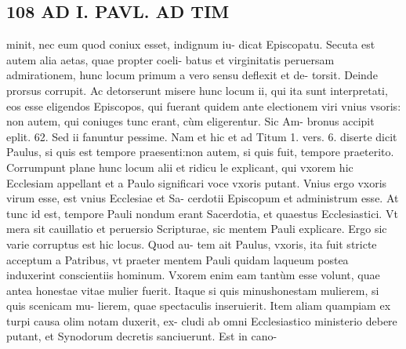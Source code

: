 \documentclass{article}
\begin{document}
\begin{pages}
\section*{108 AD I. PAVL. AD TIM }\pstart minit, nec eum quod coniux esset, indignum iu- dicat Episcopatu.  \pend\pstart Secuta est autem alia aetas, quae propter coeli- batus et virginitatis peruersam admirationem, hunc locum primum a vero sensu deflexit et de- torsit. Deinde prorsus corrupit. Ac detorserunt misere hunc locum ii, qui ita sunt interpretati, eos esse eligendos Episcopos, qui fuerant quidem ante electionem viri vnius vsoris: non autem, qui coniuges tunc erant, cùm eligerentur. Sic Am- bronus accipit eplit. 62. Sed ii fanuntur pessime. Nam et hic et ad Titum 1. vers. 6. diserte dicit Paulus, si quis est tempore praesenti:non autem, si quis fuit, tempore praeterito.  \pend\pstart Corrumpunt plane hunc locum alii et ridicu le explicant, qui vxorem hic Ecclesiam appellant et a Paulo significari voce vxoris putant. Vnius ergo vxoris virum esse, est vnius Ecclesiae et Sa- cerdotii Episcopum et administrum esse. At tunc id est, tempore Pauli nondum erant Sacerdotia, et quaestus Ecclesiastici. Vt mera sit cauillatio et peruersio Scripturae, sic mentem Pauli explicare. Ergo sic varie corruptus est hic locus. Quod au- tem ait Paulus, vxoris, ita fuit stricte acceptum a Patribus, vt praeter mentem Pauli quidam laqueum postea induxerint conscientiis hominum.  \pend\pstart Vxorem enim eam tantùm esse volunt, quae antea honestae vitae mulier fuerit. Itaque si quis minushonestam mulierem, si quis scenicam mu- lierem, quae spectaculis inseruierit. Item aliam quampiam ex turpi causa olim notam duxerit, ex- cludi ab omni Ecclesiastico ministerio debere putant, et Synodorum decretis sanciuerunt. Est in cano-  \pend

\end{pages}
\end{document}
